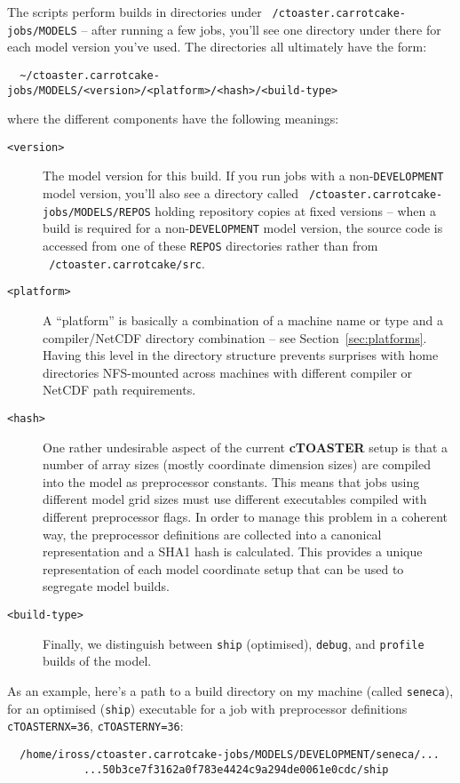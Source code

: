 \documentclass[a4paper,10pt,article]{memoir}
\begin{document}
The scripts perform builds in directories under
\texttt{~/ctoaster.carrotcake-jobs/MODELS} -- after running a few jobs, you'll see
one directory under there for each model version you've used.  The
directories all ultimately have the form:
\begin{verbatim}
  ~/ctoaster.carrotcake-jobs/MODELS/<version>/<platform>/<hash>/<build-type>
\end{verbatim}
where the different components have the following meanings:
\begin{description}
  \item[\texttt{<version>}]{The model version for this build.  If you
    run jobs with a non-\texttt{DEVELOPMENT} model version, you'll
    also see a directory called \texttt{~/ctoaster.carrotcake-jobs/MODELS/REPOS}
    holding repository copies at fixed versions -- when a build is
    required for a non-\texttt{DEVELOPMENT} model version, the source
    code is accessed from one of these \texttt{REPOS} directories
    rather than from \texttt{~/ctoaster.carrotcake/src}.}
  \item[\texttt{<platform>}]{A ``platform'' is basically a combination
    of a machine name or type and a compiler/NetCDF directory
    combination -- see Section~\ref{sec:platforms}.  Having this level
    in the directory structure prevents surprises with home
    directories NFS-mounted across machines with different compiler or
    NetCDF path requirements.}
  \item[\texttt{<hash>}]{One rather undesirable aspect of the current
    \textbf{cTOASTER} setup is that a number of array sizes (mostly coordinate
    dimension sizes) are compiled into the model as preprocessor
    constants.  This means that jobs using different model grid sizes
    must use different executables compiled with different
    preprocessor flags.  In order to manage this problem in a coherent
    way, the preprocessor definitions are collected into a canonical
    representation and a SHA1 hash is calculated.  This provides a
    unique representation of each model coordinate setup that can be
    used to segregate model builds.}
  \item[\texttt{<build-type>}]{Finally, we distinguish between
    \texttt{ship} (optimised), \texttt{debug}, and \texttt{profile}
    builds of the model.}
\end{description}
As an example, here's a path to a build directory on my machine
(called \texttt{seneca}), for an optimised (\texttt{ship}) executable
for a job with preprocessor definitions \texttt{cTOASTERNX=36},
\texttt{cTOASTERNY=36}:
\begin{verbatim}
  /home/iross/ctoaster.carrotcake-jobs/MODELS/DEVELOPMENT/seneca/...
            ...50b3ce7f3162a0f783e4424c9a294de0061e0cdc/ship
\end{verbatim}
\end{document}
